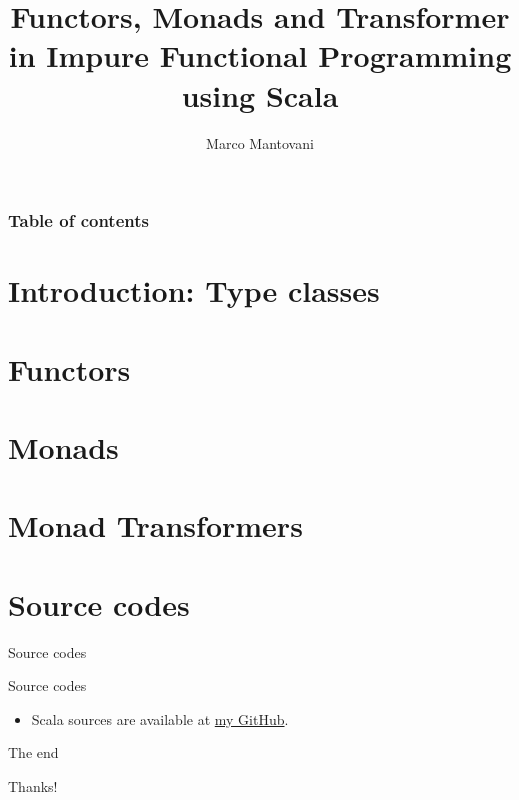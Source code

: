 \documentclass{beamer}
\title[Functors, Monads \& Transformer in FP]{Functors, Monads and Transformer in Impure Functional Programming using Scala}
\author{Marco Mantovani}
\begin{document}
	
	\begin{frame}
		\maketitle
	\end{frame}
	
	\begin{frame}
		\frametitle{Table of contents}
		\tableofcontents
	\end{frame}
	
	\section{Introduction: Type classes}
	
	
	\section{Functors}
	
			
	\section{Monads}
	
	
	\section{Monad Transformers}
	

	\section{Source codes}
	\begin{frame}{Source codes}
	
		Source codes
		\begin{itemize}
			\item Scala sources are available at \href{https://github.com/Tovy97/TypeclassFunctorMonad\_Scala}{my GitHub}.
		\end{itemize}
	\end{frame}

	\begin{frame}{The end}	
		\begin{center}
			Thanks!
		\end{center}
	\end{frame}
\end{document}

